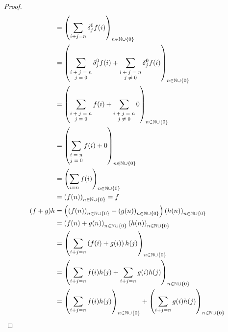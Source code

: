 \documentclass[dvipdfmx]{jsarticle}
\begin{document}
\begin{proof}
\begin{align*}
&= \left( \sum_{i + j = n}  \delta_{j}^{0} f(i) \right)_{n \in \mathbb{N} \cup \left\{ 0 \right\}}\\
&= \left( \sum_{\scriptsize \begin{matrix} i + j = n \\j = 0 \end{matrix}} {\delta_{j}^{0}f(i)} + \sum_{\scriptsize \begin{matrix} i + j = n \\j \neq 0 \end{matrix}} \delta_{j}^{0}f(i) \right)_{n \in \mathbb{N} \cup \left\{ 0 \right\}}\\
&= \left( \sum_{\scriptsize \begin{matrix} i + j = n \\j = 0 \end{matrix}} {f(i)} + \sum_{\scriptsize \begin{matrix} i + j = n \\j \neq 0 \end{matrix}} 0 \right)_{n \in \mathbb{N} \cup \left\{ 0 \right\}}\\
&= \left( \sum_{\scriptsize \begin{matrix} i = n \\j = 0\\ \end{matrix}} {f(i)} + 0 \right)_{n \in \mathbb{N} \cup \left\{ 0 \right\}}\\
&= \left( \sum_{i = n } {f(i)} \right)_{n \in \mathbb{N} \cup \left\{ 0 \right\}}\\
&= \left( f(n) \right)_{n \in \mathbb{N} \cup \left\{ 0 \right\}} = f\\
(f + g)h &= \left( \left( f(n) \right)_{n \in \mathbb{N} \cup \left\{ 0 \right\}} + \left( g(n) \right)_{n \in \mathbb{N} \cup \left\{ 0 \right\}} \right)\left( h(n) \right)_{n \in \mathbb{N} \cup \left\{ 0 \right\}}\\
&= \left( f(n) + g(n) \right)_{n \in \mathbb{N} \cup \left\{ 0 \right\}}\left( h(n) \right)_{n \in \mathbb{N} \cup \left\{ 0 \right\}}\\
&= \left( \sum_{i + j = n} {\left( f(i) + g(i) \right)h(j)} \right)_{n \in \mathbb{N} \cup \left\{ 0 \right\}}\\
&= \left( \sum_{i + j = n} {f(i)h(j)} + \sum_{i + j = n} {g(i)h(j)} \right)_{n \in \mathbb{N} \cup \left\{ 0 \right\}}\\
&= \left( \sum_{i + j = n} {f(i)h(j)} \right)_{n \in \mathbb{N} \cup \left\{ 0 \right\}} + \left( \sum_{i + j = n} {g(i)h(j)} \right)_{n \in \mathbb{N} \cup \left\{ 0 \right\}}\\

\end{align*}
\end{proof}
\end{document}

